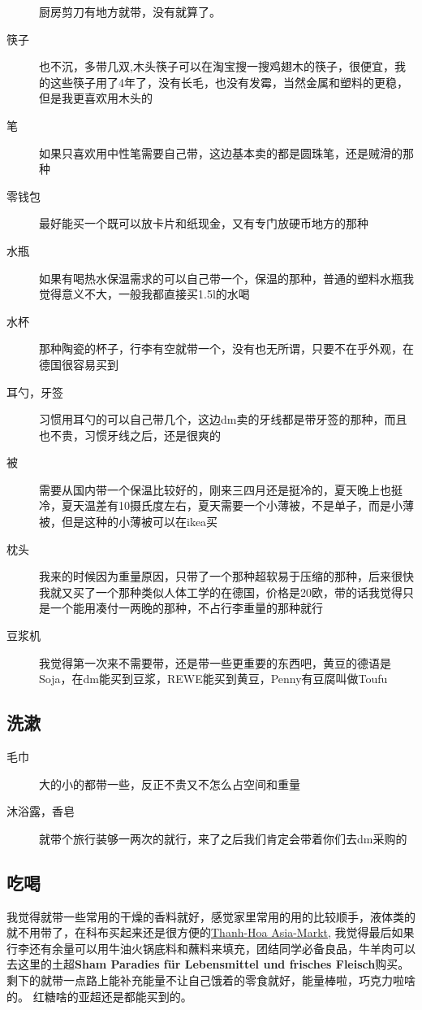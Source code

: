 \documentclass[doku.tex]{subfiles}
\begin{document}
\begin{description}
		厨房剪刀有地方就带，没有就算了。
		\item[筷子] 也不沉，多带几双,木头筷子可以在淘宝搜一搜鸡翅木的筷子，很便宜，我的这些筷子用了4年了，没有长毛，也没有发霉，当然金属和塑料的更稳，但是我更喜欢用木头的~ \label{chopstick}
		\item[笔] 如果只喜欢用中性笔需要自己带，这边基本卖的都是圆珠笔，还是贼滑的那种
		\item[零钱包] 最好能买一个既可以放卡片和纸现金，又有专门放硬币地方的那种
		\item[水瓶] 如果有喝热水保温需求的可以自己带一个，保温的那种，普通的塑料水瓶我觉得意义不大，一般我都直接买1.5l的水喝
		\item[水杯] 那种陶瓷的杯子，行李有空就带一个，没有也无所谓，只要不在乎外观，在德国很容易买到
		\item[耳勺，牙签] 习惯用耳勺的可以自己带几个，这边dm卖的牙线都是带牙签的那种，而且也不贵，习惯牙线之后，还是很爽的
		\item[被] 需要从国内带一个保温比较好的，刚来三四月还是挺冷的，夏天晚上也挺冷，夏天温差有10摄氏度左右，夏天需要一个小薄被，不是单子，而是小薄被，但是这种的小薄被可以在ikea买
		\item[枕头] 我来的时候因为重量原因，只带了一个那种超软易于压缩的那种，后来很快我就又买了一个那种类似人体工学的在德国，价格是20欧，带的话我觉得只是一个能用凑付一两晚的那种，不占行李重量的那种就行
		\item[豆浆机] 我觉得第一次来不需要带，还是带一些更重要的东西吧，黄豆的德语是Soja，在dm能买到豆浆，REWE能买到黄豆，Penny有豆腐叫做Toufu
		
\end{description}

	\subsection{洗漱}
\begin{description}
		\item[毛巾] 大的小的都带一些，反正不贵又不怎么占空间和重量
		\item[沐浴露，香皂] 就带个旅行装够一两次的就行，来了之后我们肯定会带着你们去dm采购的
\end{description}

	\subsection{吃喝}
我觉得就带一些常用的干燥的香料就好，感觉家里常用的用的比较顺手，液体类的就不用带了，在科布买起来还是很方便的\href{http://www.thanh-hoa.de/}{Thanh-Hoa Asia-Markt}, 我觉得最后如果行李还有余量可以用牛油火锅底料和蘸料来填充，团结同学必备良品，牛羊肉可以去这里的土超\textbf{Sham Paradies für Lebensmittel und frisches Fleisch}购买。 剩下的就带一点路上能补充能量不让自己饿着的零食就好，能量棒啦，巧克力啦啥的。 红糖啥的亚超还是都能买到的。
\end{document}
